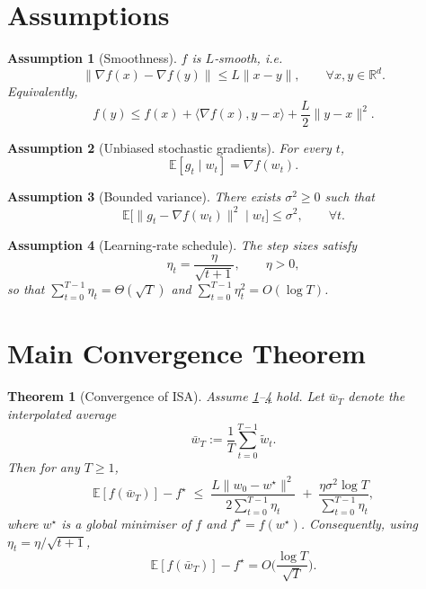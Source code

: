 \documentclass{article}
\newtheorem{theorem}{Theorem}
\newtheorem{assumption}{Assumption}
\newcommand{\E}{\mathbb{E}}
\newcommand{\R}{\mathbb{R}}
\begin{document}
\newpage
\section*{Assumptions}
\begin{assumption}[Smoothness]\label{as:smooth}
$f$ is $L$‑smooth, i.e.
\[
\|\nabla f(x)-\nabla f(y)\|\le L\|x-y\|,\qquad\forall x,y\in\R^{d}.
\tag{A1}
\]
Equivalently,
\[
f(y)\le f(x)+\langle\nabla f(x),y-x\rangle+\frac{L}{2}\|y-x\|^2 .
\tag{A1'}
\]
\end{assumption}

\begin{assumption}[Unbiased stochastic gradients]\label{as:unbiased}
For every $t$,
\[
\E[g_t\mid w_t]=\nabla f(w_t).
\tag{A2}
\]
\end{assumption}

\begin{assumption}[Bounded variance]\label{as:var}
There exists $\sigma^2\ge0$ such that
\[
\E\big[\|g_t-\nabla f(w_t)\|^2\mid w_t\big]\le\sigma^2,\qquad\forall t.
\tag{A3}
\]
\end{assumption}

\begin{assumption}[Learning‑rate schedule]\label{as:lr}
The step sizes satisfy
\[
\eta_t = \frac{\eta}{\sqrt{t+1}},\qquad \eta>0,
\tag{A4}
\]
so that $\sum_{t=0}^{T-1}\eta_t = \Theta(\sqrt{T})$ and $\sum_{t=0}^{T-1}\eta_t^2 = O(\log T)$.
\end{assumption}

\section*{Main Convergence Theorem}
\begin{theorem}[Convergence of ISA]\label{thm:main}
Assume \ref{as:smooth}–\ref{as:lr} hold. Let $\bar w_T$ denote the \emph{interpolated average}
\[
\bar w_T := \frac{1}{T}\sum_{t=0}^{T-1}\tilde w_t .
\]
Then for any $T\ge 1$,
\[
\E\!\left[f(\bar w_T)\right] - f^\star
\;\le\;
\frac{L\|w_0-w^\star\|^2}{2\sum_{t=0}^{T-1}\eta_t}
   \;+\;
   \frac{\eta\sigma^2\log T}{\sum_{t=0}^{T-1}\eta_t},
\tag{3}
\]
where $w^\star$ is a global minimiser of $f$ and $f^\star=f(w^\star)$.  
Consequently, using $\eta_t=\eta/\sqrt{t+1}$,
\[
\E\!\left[f(\bar w_T)\right]-f^\star = O\!\Big(\frac{\log T}{\sqrt{T}}\Big).
\]
\end{theorem}
\end{document}
